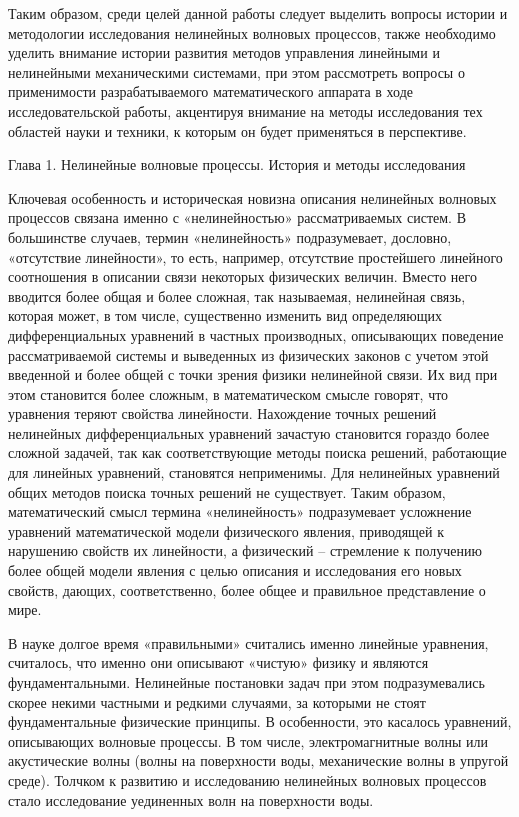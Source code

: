 Таким образом, среди целей данной работы следует выделить вопросы истории и методологии исследования нелинейных волновых процессов, также необходимо уделить внимание истории развития методов управления линейными и нелинейными механическими системами, при этом рассмотреть вопросы о применимости разрабатываемого математического аппарата в ходе исследовательской работы, акцентируя внимание на методы исследования тех областей науки и техники, к которым он будет применяться в перспективе.

Глава 1. Нелинейные волновые процессы. История и методы исследования 

Ключевая особенность и историческая новизна описания нелинейных волновых процессов связана именно с «нелинейностью» рассматриваемых систем. В большинстве случаев, термин «нелинейность» подразумевает, дословно, «отсутствие линейности», то есть, например, отсутствие простейшего линейного соотношения в описании связи некоторых физических величин. Вместо него вводится более общая и более сложная, так называемая, нелинейная связь, которая может, в том числе, существенно изменить вид определяющих дифференциальных уравнений в частных производных, описывающих поведение рассматриваемой системы и выведенных из физических законов с учетом этой введенной и более общей с точки зрения физики нелинейной связи. Их вид при этом становится более сложным, в математическом смысле говорят, что уравнения теряют свойства линейности. Нахождение точных решений нелинейных дифференциальных уравнений зачастую становится гораздо более сложной задачей, так как соответствующие методы поиска решений, работающие для линейных уравнений, становятся неприменимы. Для нелинейных уравнений общих методов поиска точных решений не существует. Таким образом, математический смысл термина «нелинейность» подразумевает усложнение уравнений математической модели физического явления, приводящей к нарушению свойств их линейности, а физический – стремление к получению более общей модели явления с целью описания и исследования его новых свойств, дающих, соответственно, более общее и правильное представление о мире.

В науке долгое время «правильными» считались именно линейные уравнения, считалось, что именно они описывают «чистую» физику и являются фундаментальными. Нелинейные постановки задач при этом подразумевались скорее некими частными и редкими случаями, за которыми не стоят фундаментальные физические принципы. В особенности, это касалось уравнений, описывающих волновые процессы. В том числе, электромагнитные волны или акустические волны (волны на поверхности воды, механические волны в упругой среде). Толчком к развитию и исследованию нелинейных волновых процессов стало исследование уединенных волн на поверхности воды.

